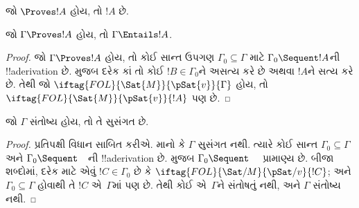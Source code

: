 \documentclass[../../../include/open-logic-section]{subfiles}
\begin{document}
\begin{cor}
જો $\Proves !A$ હોય, તો $!A$  છે.
\end{cor}

\begin{cor}
જો $\Gamma \Proves !A$ હોય, તો $\Gamma \Entails !A$.
\end{cor}

\begin{proof}
જો $\Gamma \Proves !A$ હોય, તો કોઈ સાન્ત ઉપગણ
$\Gamma_0 \subseteq \Gamma$ માટે $\Gamma_0 \Sequent !A$ની
!!a{derivation} છે.  મુજબ દરેક
કાં તો કોઈ $!B \in \Gamma_0$ને અસત્ય કરે છે અથવા $!A$ને સત્ય કરે છે.
તેથી જો $\iftag{FOL}{\Sat{M}}{\pSat{v}}{\Gamma}$ હોય, તો
$\iftag{FOL}{\Sat{M}}{\pSat{v}}{!A}$ પણ છે.
\end{proof}

\begin{cor}
જો $\Gamma$ સંતોષ્ય હોય, તો તે સુસંગત છે.
\end{cor}

\begin{proof}
પ્રતિપક્ષી વિધાન સાબિત કરીએ. માનો કે $\Gamma$ સુસંગત નથી. ત્યારે કોઈ
સાન્ત $\Gamma_0 \subseteq \Gamma$ અને
$\Gamma_0 \Sequent \quad$ની !!a{derivation} છે.
 મુજબ $\Gamma_0 \Sequent \quad$ પ્રામાણ્ય
છે. બીજા શબ્દોમાં, દરેક
માટે એવું $!C \in \Gamma_0$ છે કે
$\iftag{FOL}{\Sat/{M}}{\pSat/{v}}{!C}$; અને
$\Gamma_0 \subseteq \Gamma$ હોવાથી તે $!C$ એ~$\Gamma$માં પણ છે. તેથી
કોઈ  એ~$\Gamma$ને સંતોષતું નથી,
અને $\Gamma$ સંતોષ્ય નથી.
\end{proof}
\end{document}
